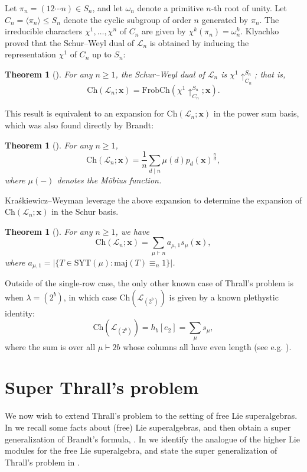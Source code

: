 \documentclass[11pt]{article}
\newtheorem{thm}[theo]{Theorem}
\theoremstyle{definition}
\numberwithin{equation}{section}
\newcommand\maj{\mathrm{maj}}
\newcommand\SYT{\mathrm{SYT}}
\newcommand\xb{\mathbf{x}}
\newcommand\Lcal{\mathcal{L}}
\newcommand\Ch{\mathrm{Ch}}
\newcommand\FrobCh{\mathrm{FrobCh}}
\begin{document}
Let $\pi_n = (12 \cdots n) \in S_n$, and let $\omega_n$ denote a primitive $n$-th root of unity. Let $C_n = \langle \pi_n \rangle \le S_n$ denote the cyclic subgroup of order $n$ generated by $\pi_n$. The irreducible characters $\chi^1, \ldots, \chi^n$ of $C_n$ are given by $\chi^k(\pi_n) = \omega_n^k$. Klyachko proved that the Schur--Weyl dual of $\Lcal_n$ is obtained by inducing the representation $\chi^1$ of $C_n$ up to $S_n$:
\begin{thm}[\cite{Kly}]\label{thm:kly}
For any $n \ge 1$, the Schur--Weyl dual of $\Lcal_n$ is $\chi^1 \uparrow_{C_n}^{S_n}$; that is,
\[
\Ch(\Lcal_n;\xb) = \FrobCh(\chi^1 \uparrow_{C_n}^{S_n};\xb).
\]
\end{thm}
This result is equivalent to an expansion for $\Ch(\Lcal_n;\xb)$ in the power sum basis, which was also found directly by Brandt:
\begin{thm}[\cite{Brandt}]\label{thm:brandt}
For any $n \ge 1$,
\[
\Ch(\Lcal_n;\xb) = \frac{1}{n} \sum_{d \mid n} \mu(d) p_d(\xb)^{\frac{n}{d}},
\]
where $\mu(-)$ denotes the M{\"o}bius function.
\end{thm}
Kra{\'s}kiewicz--Weyman leverage the above expansion to determine the expansion of $\Ch(\Lcal_n;\xb)$ in the Schur basis.
\begin{thm}[\cite{KW}]\label{thm:KW}
For any $n \ge 1$, we have
\[
\Ch(\Lcal_n;\xb) = \sum_{\mu \vdash n} a_{\mu,1} s_\mu(\xb),
\]
where $a_{\mu,1} = |\{ T \in \SYT(\mu) : \maj(T) \equiv_n 1 \}|$.
\end{thm}
Outside of the single-row case, the only other known case of Thrall's problem is when $\lambda = (2^b)$, in which case $\Ch(\Lcal_{(2^b)})$ is given by a known plethystic identity:
\[
\Ch(\Lcal_{(2^b)}) = h_b[e_2] = \sum_{\mu} s_\mu,
\]
where the sum is over all $\mu \vdash 2b$ whose columns all have even length (see e.g. \cite[Ex.~I.8.6(b)]{Mac}).

\section{Super Thrall's problem}\label{sec:Thrall}
We now wish to extend Thrall's problem to the setting of free Lie superalgebras. In  we recall some facts about (free) Lie superalgebras, and then obtain a super generalization of Brandt's formula, . In  we identify the analogue of the higher Lie modules for the free Lie superalgebra, and state the super generalization of Thrall's problem in .
\end{document}
